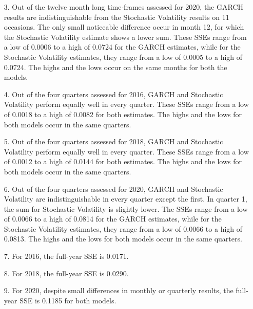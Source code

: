 \documentclass[11pt]{beamer}
\begin{document}
\begin{frame}

\begin{enumerate}
\item[3.] Out of the twelve month long time-frames assessed for 2020, the GARCH results are indistinguishable from the Stochastic Volatility results on 11 occasions. The only small noticeable difference occur in month 12, for which the Stochastic Volatility estimate shows a lower sum. These SSEs range from a low of 0.0006 to a high of 0.0724 for the GARCH estimates, while for the Stochastic Volatility estimates, they range from a low of 0.0005 to a high of 0.0724. The highs and the lows occur on the same months for both the models.

\end{enumerate}

\end{frame}

\begin{frame}
\begin{enumerate}


\item[4.] Out of the four quarters assessed for 2016, GARCH and Stochastic Volatility perform equally well in every quarter. These SSEs range from a low of 0.0018 to a high of 0.0082 for both estimates. The highs and the lows for both models occur in the same quarters. 
\item[5.] Out of the four quarters assessed for 2018, GARCH and Stochastic Volatility perform equally well in every quarter. These SSEs range from a low of 0.0012 to a high of 0.0144 for both estimates. The highs and the lows for both models occur in the same quarters. 



\end{enumerate}
\end{frame}

\begin{frame}
\begin{enumerate}
\item[6.] Out of the four quarters assessed for 2020, GARCH and Stochastic Volatility are indistinguishable in every quarter except the first. In quarter 1, the sum for Stochastic Volatility is slightly lower. The SSEs range from a low of 0.0066 to a high of 0.0814 for the GARCH estimates, while for the Stochastic Volatility estimates, they range from a low of 0.0066 to a high of 0.0813. The highs and the lows for both models occur in the same quarters. 
\item[7.] For 2016, the full-year SSE is 0.0171. 

\item[8.] For 2018, the full-year SSE is 0.0290. 

\item [9.] For 2020, despite small differences in monthly or quarterly results, the full-year SSE is 0.1185 for both models.   



\end{enumerate}
\end{frame}
\end{document}
